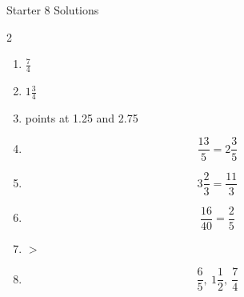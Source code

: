 \documentclass{beamer}
\begin{document}
\begin{frame}{Starter 8 Solutions}

\begin{multicols}{2}

\begin{enumerate}

\item $\frac{7}{4}$

\item $1\frac{3}{4}$

\item points at 1.25 and 2.75

\item 
\[
\frac{13}{5}=2\frac{3}{5}
\]

\item 
\[
3\frac{2}{3}=\frac{11}{3}
\]

\columnbreak

\item 
\[
\frac{16}{40}=\frac{2}{5}
\]

\item $>$

\item 
\[
\frac{6}{5},\ 1\frac{1}{2},\ \frac{7}{4}
\]

\end{enumerate}

\end{multicols}

\end{frame}
\end{document}
